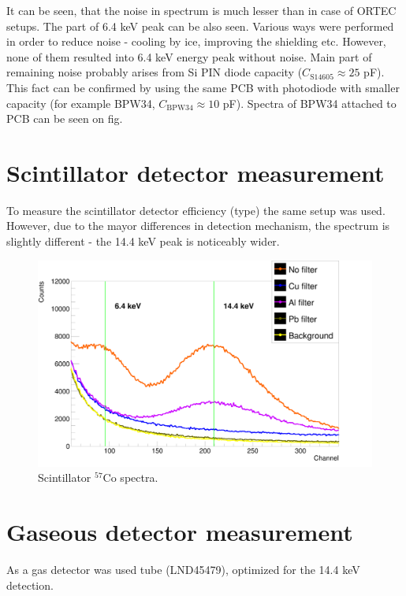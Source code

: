 It can be seen, that the noise in spectrum is much lesser than in case of ORTEC setups. The part of 6.4 keV peak can be also seen. Various ways were performed in order to reduce noise - cooling by ice, improving the shielding etc. However, none of them resulted into 6.4 keV energy peak without noise. Main part of remaining noise probably arises from Si PIN diode capacity ($C_{\textrm{S14605}} \approx 25$ pF). This fact can be confirmed by using the same PCB with photodiode with smaller capacity (for example BPW34, $C_{\textrm{BPW34}} \approx 10$ pF). Spectra of BPW34 attached to PCB can be seen on fig.



\section{Scintillator detector measurement}
To measure the scintillator detector efficiency (type) the same setup was used. However, due to the mayor differences in detection mechanism, the spectrum is slightly different - the 14.4 keV peak is noticeably wider.

\begin{figure}[H]
\centering
\includegraphics[scale=0.125, angle = 0]{./pictures/PMTSpectre.png}
\caption{Scintillator $^{57}$Co spectra.}
\label{Scintillator detector spectra.}
\end{figure}


\section{Gaseous detector measurement}
As a gas detector was used tube (LND45479), optimized for the 14.4 keV detection.

